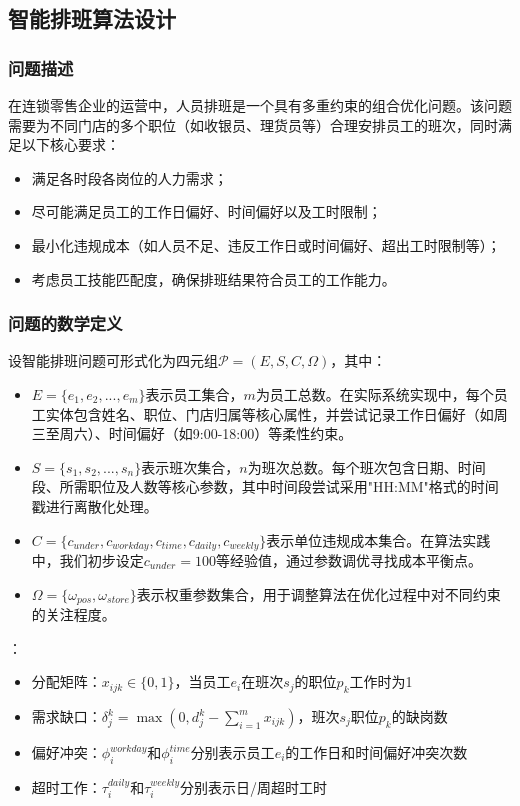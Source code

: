 
\subsection{智能排班算法设计}
\subsubsection{问题描述}

在连锁零售企业的运营中，人员排班是一个具有多重约束的组合优化问题。该问题需要为不同门店的多个职位（如收银员、理货员等）合理安排员工的班次，同时满足以下核心要求：
\begin{itemize}
    \item 满足各时段各岗位的人力需求；
    \item 尽可能满足员工的工作日偏好、时间偏好以及工时限制；
    \item 最小化违规成本（如人员不足、违反工作日或时间偏好、超出工时限制等）；
    \item 考虑员工技能匹配度，确保排班结果符合员工的工作能力。
\end{itemize}


\subsubsection{问题的数学定义}
设智能排班问题可形式化为四元组$\mathcal{P}=(E, S, C, \Omega)$，其中：
\begin{itemize}
    \item $E = \{e_1,e_2,...,e_m\}$表示员工集合，$m$为员工总数。在实际系统实现中，每个员工实体包含姓名、职位、门店归属等核心属性，并尝试记录工作日偏好（如周三至周六）、时间偏好（如9:00-18:00）等柔性约束。
    \item $S = \{s_1,s_2,...,s_n\}$表示班次集合，$n$为班次总数。每个班次包含日期、时间段、所需职位及人数等核心参数，其中时间段尝试采用"HH:MM"格式的时间戳进行离散化处理。
    \item $C = \{c_{under},c_{workday},c_{time},c_{daily},c_{weekly}\}$表示单位违规成本集合。在算法实践中，我们初步设定$c_{under}=100$等经验值，通过参数调优寻找成本平衡点。
    \item $\Omega = \{\omega_{pos}, \omega_{store}\}$表示权重参数集合，用于调整算法在优化过程中对不同约束的关注程度。
\end{itemize}

{}：
\begin{itemize}
    \item 分配矩阵：$x_{ijk} \in \{0,1\}$，当员工$e_i$在班次$s_j$的职位$p_k$工作时为1
    \item 需求缺口：$\delta_j^k = \max(0, d_j^k - \sum_{i=1}^m x_{ijk})$，班次$s_j$职位$p_k$的缺岗数
    \item 偏好冲突：$\phi_i^{workday}$和$\phi_i^{time}$分别表示员工$e_i$的工作日和时间偏好冲突次数
    \item 超时工作：$\tau_i^{daily}$和$\tau_i^{weekly}$分别表示日/周超时工时
\end{itemize}

